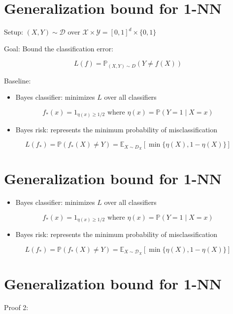 \section*{Generalization bound for 1-NN}
Setup: $(X, Y) \sim \mathscr{D}$ over $\mathscr{X} \times \mathscr{Y}=[0,1]^{d} \times\{0,1\}$

Goal: Bound the classification error:

$$
L(f)=\mathbb{P}_{(X, Y) \sim D}(Y \neq f(X))
$$

Baseline:

\begin{itemize}
  \item Bayes classifier: minimizes $L$ over all classifiers
\end{itemize}

$$
f_{*}(x)=1_{\eta(x) \geq 1 / 2} \text { where } \eta(x)=\mathbb{P}(Y=1 \mid X=x)
$$

\begin{itemize}
  \item Bayes risk: represents the minimum probability of misclassification
\end{itemize}

$$
L\left(f_{*}\right)=\mathbb{P}\left(f_{*}(X) \neq Y\right)=\mathbb{E}_{X \sim D_{X}}[\min \{\eta(X), 1-\eta(X)\}]
$$

\section*{Generalization bound for 1-NN}

\begin{itemize}
  \item Bayes classifier: minimizes $L$ over all classifiers
\end{itemize}

$$
f_{*}(x)=1_{\eta(x) \geq 1 / 2} \text { where } \eta(x)=\mathbb{P}(Y=1 \mid X=x)
$$

\begin{itemize}
  \item Bayes risk: represents the minimum probability of misclassification
\end{itemize}

$$
L\left(f_{*}\right)=\mathbb{P}\left(f_{*}(X) \neq Y\right)=\mathbb{E}_{X \sim \mathscr{D}_{X}}[\min \{\eta(X), 1-\eta(X)\}]
$$

\section*{Generalization bound for 1-NN}
Proof 2:

